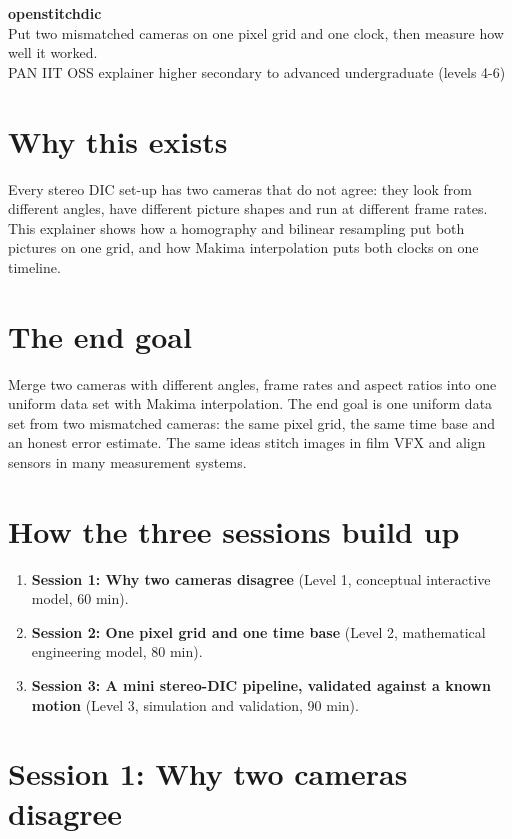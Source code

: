 \documentclass[11pt,a4paper]{article}
\begin{document}
\begin{center}{\LARGE\bfseries openstitchdic}\\[0.4em]{\large Put two mismatched cameras on one pixel grid and one clock, then measure how well it worked.}\\[0.2em]\small PAN IIT OSS explainer \textbullet{} higher secondary to advanced undergraduate (levels 4-6)\end{center}

\section*{Why this exists}
Every stereo DIC set-up has two cameras that do not agree: they look from different angles, have different picture shapes and run at different frame rates. This explainer shows how a homography and bilinear resampling put both pictures on one grid, and how Makima interpolation puts both clocks on one timeline.

\section*{The end goal}
Merge two cameras with different angles, frame rates and aspect ratios into one uniform data set with Makima interpolation. The end goal is one uniform data set from two mismatched cameras: the same pixel grid, the same time base and an honest error estimate. The same ideas stitch images in film VFX and align sensors in many measurement systems.

\section*{How the three sessions build up}
\begin{enumerate}[nosep]
\item \textbf{Session 1: Why two cameras disagree} (Level 1, conceptual interactive model, 60 min).
\item \textbf{Session 2: One pixel grid and one time base} (Level 2, mathematical engineering model, 80 min).
\item \textbf{Session 3: A mini stereo-DIC pipeline, validated against a known motion} (Level 3, simulation and validation, 90 min).
\end{enumerate}

\section{Session 1: Why two cameras disagree}
\end{document}
